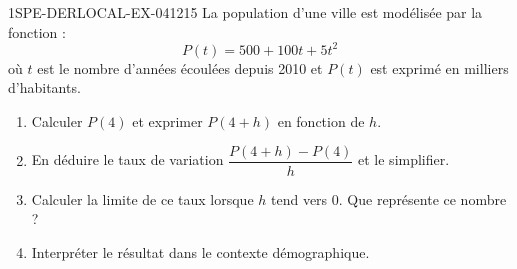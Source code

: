 \begin{exercice}{1SPE-DERLOCAL-EX-041}{2}{15}
La population d'une ville est modélisée par la fonction :
\[
P(t) = 500 + 100t + 5t^2
\]
où $t$ est le nombre d'années écoulées depuis 2010 et $P(t)$ est exprimé en milliers d'habitants.
\begin{enumerate}
\item Calculer $P(4)$ et exprimer $P(4+h)$ en fonction de $h$.
\item En déduire le taux de variation $\dfrac{P(4+h) - P(4)}{h}$ et le simplifier.
\item Calculer la limite de ce taux lorsque $h$ tend vers $0$. Que représente ce nombre ?
\item Interpréter le résultat dans le contexte démographique.
\end{enumerate}
\end{exercice}
